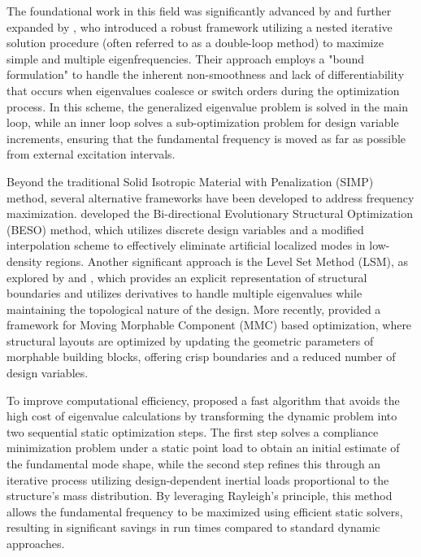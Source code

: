 \documentclass[pdflatex,lineno,sn-mathphys-ay]{sn-jnl}
\begin{document}
The foundational work in this field was significantly advanced by \citet{Du2007} and further expanded by \citet{Olhoff2014}, who introduced a robust framework utilizing a nested iterative solution procedure (often referred to as a double-loop method) to maximize simple and multiple eigenfrequencies. Their approach employs a "bound formulation" to handle the inherent non-smoothness and lack of differentiability that occurs when eigenvalues coalesce or switch orders during the optimization process. In this scheme, the generalized eigenvalue problem is solved in the main loop, while an inner loop solves a sub-optimization problem for design variable increments, ensuring that the fundamental frequency is moved as far as possible from external excitation intervals.

Beyond the traditional Solid Isotropic Material with Penalization (SIMP) method, several alternative frameworks have been developed to address frequency maximization. \citet{Huang2010} developed the Bi-directional Evolutionary Structural Optimization (BESO) method, which utilizes discrete design variables and a modified interpolation scheme to effectively eliminate artificial localized modes in low-density regions. Another significant approach is the Level Set Method (LSM), as explored by \citet{Xia2011} and \citet{Shu2014}, which provides an explicit representation of structural boundaries and utilizes derivatives to handle multiple eigenvalues while maintaining the topological nature of the design. More recently, \citet{Huang2025} provided a framework for Moving Morphable Component (MMC) based optimization, where structural layouts are optimized by updating the geometric parameters of morphable building blocks, offering crisp boundaries and a reduced number of design variables.

To improve computational efficiency, \citet{Yuksel2025} proposed a fast algorithm that avoids the high cost of eigenvalue calculations by transforming the dynamic problem into two sequential static optimization steps. The first step solves a compliance minimization problem under a static point load to obtain an initial estimate of the fundamental mode shape, while the second step refines this through an iterative process utilizing design-dependent inertial loads proportional to the structure's mass distribution. By leveraging Rayleigh’s principle, this method allows the fundamental frequency to be maximized using efficient static solvers, resulting in significant savings in run times compared to standard dynamic approaches.
\end{document}
